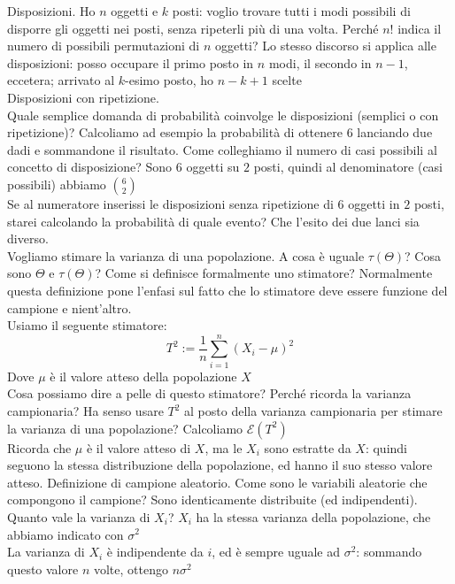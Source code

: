 \documentclass{article}
\begin{document}
    Disposizioni. Ho $ n $ oggetti e $ k $ posti: voglio trovare tutti i modi possibili di disporre gli oggetti nei posti, senza ripeterli più di una volta. Perché $ n! $
    indica il numero di possibili permutazioni di $ n $ oggetti? Lo stesso discorso si applica alle disposizioni: posso occupare il primo posto in $ n $ modi, il secondo in
    $ n - 1 $, eccetera; arrivato al $ k $-esimo posto, ho $ n - k + 1 $ scelte \\
    Disposizioni con ripetizione. \\
    Quale semplice domanda di probabilità coinvolge le disposizioni (semplici o con ripetizione)? Calcoliamo ad esempio la probabilità di ottenere $ 6 $ lanciando due dadi e
    sommandone il risultato. Come colleghiamo il numero di casi possibili al concetto di disposizione? Sono $ 6 $ oggetti su $ 2 $ posti, quindi al denominatore (casi
    possibili) abbiamo $ \binom{ 6 }{ 2 } $ \\
    Se al numeratore inserissi le disposizioni senza ripetizione di $ 6 $ oggetti in $ 2 $ posti, starei calcolando la probabilità di quale evento? Che l'esito dei due lanci
    sia diverso. \\
    Vogliamo stimare la varianza di una popolazione. A cosa è uguale $ \tau ( \Theta ) $? Cosa sono $ \Theta $ e $ \tau ( \Theta ) $? Come si definisce formalmente uno
    stimatore? Normalmente questa definizione pone l'enfasi sul fatto che lo stimatore deve essere funzione del campione e nient'altro. \\
    Usiamo il seguente stimatore: \\
    \[
        T^2 := \frac{ 1 }{ n } \sum_{ i = 1 }^n ( X_i - \mu )^2
    \]
    Dove $ \mu $ è il valore atteso della popolazione $ X $ \\
    Cosa possiamo dire a pelle di questo stimatore? Perché ricorda la varianza campionaria? Ha senso usare $ T^2 $ al posto della varianza campionaria per stimare la varianza
    di una popolazione? Calcoliamo $ \mathcal E ( T^2 ) $ \\
    Ricorda che $ \mu $ è il valore atteso di $ X $, ma le $ X_i $ sono estratte da $ X $: quindi seguono la stessa distribuzione della popolazione, ed hanno il suo stesso
    valore atteso. Definizione di campione aleatorio. Come sono le variabili aleatorie che compongono il campione? Sono identicamente distribuite (ed indipendenti). Quanto
    vale la varianza di $ X_i $? $ X_i $ ha la stessa varianza della popolazione, che abbiamo indicato con $ \sigma^2 $ \\
    La varianza di $ X_i $ è indipendente da $ i $, ed è sempre uguale ad $ \sigma^2 $: sommando questo valore $ n $ volte, ottengo $ n \sigma^2 $ \\
    
\end{document}

